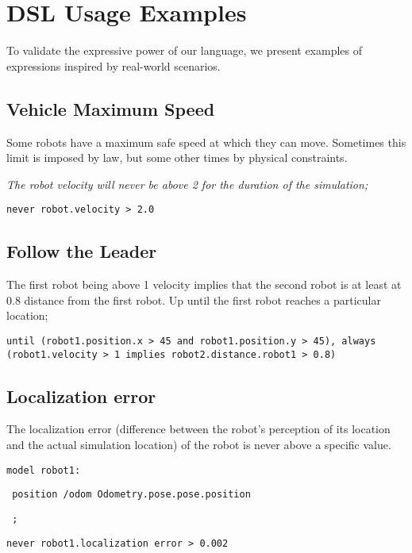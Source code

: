 \chapter{DSL Usage Examples}
\label{chap:languageexamples}

To validate the expressive power of our language, we present examples of expressions inspired by real-world scenarios.


\section{Vehicle Maximum Speed}

Some robots have a maximum safe speed at which they can move. Sometimes this limit is imposed by law, but some other times by physical constraints.


\textit{The robot velocity will never be above 2 for the duration of the simulation;}


\texttt{never robot.velocity > 2.0}

\section{Follow the Leader}

The first robot being above 1 velocity implies that the second robot is at least at 0.8 distance from the first robot. Up until the first robot reaches a particular location;


\texttt{until (robot1.position.x > 45 and robot1.position.y > 45), always (robot1.velocity > 1 implies robot2.distance.robot1 > 0.8)}


\section{Localization error}

The localization error (difference between the robot's perception of its location and the actual simulation location) of the robot is never above a specific value.

\texttt{model robot1:}

\texttt{    position /odom Odometry.pose.pose.position}

\texttt{    ;}

\texttt{never robot1.localization error > 0.002}


